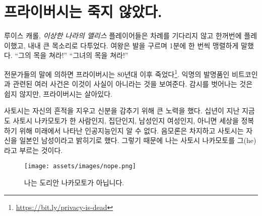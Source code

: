 \chapter{프라이버시는 죽지 않았다.}
\label{les:19}

\begin{chapquote}
	{루이스 캐롤, \textit{이상한 나라의 앨리스}}
	플레이어들은 차례를 기다리지 않고 한꺼번에 플레이했고,
	내내 큰 목소리로 다투었다.
	여왕은 발을 구르며 1분에 한 번씩 맹렬하게 말했다.
	\enquote{그의 목을 쳐라!}
	\enquote{그녀의 목을 쳐라!}
\end{chapquote}

\begin{comment}
	If pundits are to believed, privacy has been dead since the
	80ies\footnote{\url{https://bit.ly/privacy-is-dead}}. The pseudonymous invention
	of Bitcoin and other events in recent history show that this is not the case.
	Privacy is alive, even though it is by no means easy to escape the surveillance
	state.
\end{comment}
전문가들의 말에 의하면 프라이버시는 80년대 이후 죽었다\footnote{\url{https://bit.ly/privacy-is-dead}}.
익명의 발명품인 비트코인과 관련된 여러 사건은 이것이 사실이 아니라는 것을 보여준다.
감시를 벗어나는 것은 쉽지 않지만, 프라이버시는 살아있다.

\begin{comment}
	Satoshi went through great lengths to cover up his tracks and conceal
	his identity. Ten years later, it is still unknown if Satoshi Nakamoto
	was a single person, a group of people, male, female, or a
	time-traveling AI which bootstrapped itself to take over the world.
	Conspiracy theories aside, Satoshi chose to identify himself to be a
	Japanese male, which is why I don't assume but respect his chosen gender
	and refer to him as \textit{he}.
\end{comment}
사토시는 자신의 흔적을 지우고 신분을 감추기 위해 큰 노력을 했다.
십년이 지난 지금도 사토시 나카모토가 한 사람인지, 
집단인지, 남성인지 여성인지, 아니면 세상을 정복하기 위해 미래에서 나타난 인공지능인지 알 수 없다.
음모론은 차지하고 사토시는 자신을 일본인 남성이라고 밝히기로 했다. 
그렇기 때문에 나는 사토시 나카모토를 그(he)라고 부르는 것이다.
\begin{figure}
	\texttt{[image: assets/images/nope.png]}
	\caption{나는 도리안 나카모토가 아닙니다.}
	\label{fig:nope}
\end{figure}

